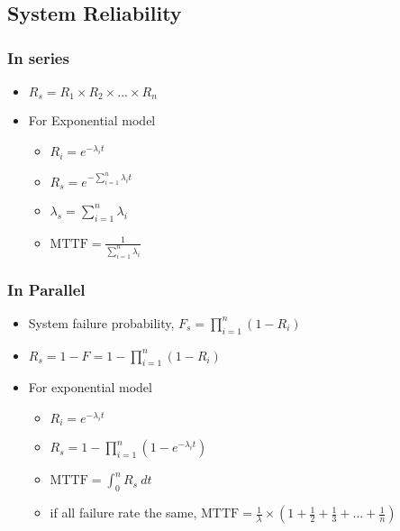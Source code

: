\documentclass[11pt]{article}
\providecommand{\tightlist}{%
      \setlength{\itemsep}{0pt}\setlength{\parskip}{0pt}}
\begin{document}
\hypertarget{system-reliability-1}{%
\subsection{System Reliability}\label{system-reliability-1}}

\hypertarget{in-series}{%
\subsubsection{In series}\label{in-series}}

\begin{itemize}
\tightlist
\item
  \(R_s=R_1\times R_2\times...\times R_n\)
\item
  For Exponential model

  \begin{itemize}
  \tightlist
  \item
    \(R_i=e^{-\lambda_i t}\)
  \item
    \(R_s = e^{-\sum_{i=1}^n\lambda_it}\)
  \item
    \(\lambda_s = \sum_{i=1}^n\lambda_i\)
  \item
    \(\text{MTTF}=\frac{1}{\sum_{i=1}^n\lambda_i}\)
  \end{itemize}
\end{itemize}

\hypertarget{in-parallel}{%
\subsubsection{In Parallel}\label{in-parallel}}

\begin{itemize}
\tightlist
\item
  System failure probability, \(F_s=\prod_{i=1}^n(1-R_i)\)
\item
  \(R_s=1-F= 1-\prod_{i=1}^n(1-R_i)\)
\item
  For exponential model

  \begin{itemize}
  \tightlist
  \item
    \(R_i=e^{-\lambda_i t}\)
  \item
    \(R_s=1-\prod_{i=1}^n(1-e^{-\lambda_it})\)
  \item
    \(\text{MTTF}=\int_0^nR_s\ dt\)
  \item
    if all failure rate the same,
    \(\text{MTTF}=\frac{1}{\lambda}\times(1+\frac{1}{2}+\frac{1}{3}+...+\frac{1}{n})\)
  \end{itemize}
\end{itemize}


    
    
    
    
\end{document}
